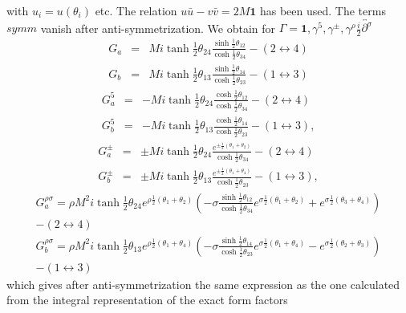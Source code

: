 \documentclass[a4paper,a4paper]{article}
\begin{document}
with $u_{i}=u(\theta _{i})$ etc. The relation $u\bar{u}-v\bar{v}=2M\mathbf{1}
$ has been used. The terms $symm$ vanish after anti-symmetrization. We
obtain for $\Gamma =\mathbf{1,}\gamma ^{5},\gamma ^{\pm },\gamma ^{\rho }%
\frac{i}{2}\overleftrightarrow{\partial ^{\sigma }}$ 
\begin{eqnarray*}
G_{a} &=&Mi\tanh \tfrac{1}{2}\theta _{24}\frac{\sinh \tfrac{1}{2}\theta _{12}%
}{\cosh \tfrac{1}{2}\theta _{34}}-(2\leftrightarrow 4) \\
G_{b} &=&Mi\tanh \tfrac{1}{2}\theta _{13}\frac{\sinh \tfrac{1}{2}\theta _{14}%
}{\cosh \tfrac{1}{2}\theta _{23}}-(1\leftrightarrow 3)
\end{eqnarray*}
\begin{eqnarray*}
G_{a}^{5} &=&-Mi\tanh \tfrac{1}{2}\theta _{24}\frac{\cosh \tfrac{1}{2}\theta
_{12}}{\cosh \tfrac{1}{2}\theta _{34}}-(2\leftrightarrow 4) \\
G_{b}^{5} &=&-Mi\tanh \tfrac{1}{2}\theta _{13}\frac{\cosh \tfrac{1}{2}\theta
_{14}}{\cosh \tfrac{1}{2}\theta _{23}}-(1\leftrightarrow 3),
\end{eqnarray*}
\begin{eqnarray*}
G_{a}^{\pm } &=&\pm Mi\tanh \tfrac{1}{2}\theta _{24}\frac{e^{\pm \frac{1}{2}%
(\theta _{1}+\theta _{2})}}{\cosh \tfrac{1}{2}\theta _{34}}%
-(2\leftrightarrow 4) \\
G_{b}^{\pm } &=&\pm Mi\tanh \tfrac{1}{2}\theta _{13}\frac{e^{\pm \frac{1}{2}%
(\theta _{1}+\theta _{4})}}{\cosh \tfrac{1}{2}\theta _{23}}%
-(1\leftrightarrow 3),
\end{eqnarray*}
\begin{gather*}
G_{a}^{\rho \sigma }=\rho M^{2}i\tanh \tfrac{1}{2}\theta _{24}e^{\rho \frac{1%
}{2}(\theta _{1}+\theta _{2})}\left( -\sigma \frac{\sinh \tfrac{1}{2}\theta
_{12}}{\cosh \tfrac{1}{2}\theta _{34}}e^{\sigma \frac{1}{2}(\theta
_{1}+\theta _{2})}+e^{\sigma \frac{1}{2}(\theta _{3}+\theta _{4})}\right) \\
-(2\leftrightarrow 4)~~~~~~~~~~~~~~ \\
G_{b}^{\rho \sigma }=\rho M^{2}i\tanh \tfrac{1}{2}\theta _{13}e^{\rho \frac{1%
}{2}(\theta _{1}+\theta _{4})}\left( -\sigma \frac{\sinh \tfrac{1}{2}\theta
_{14}}{\cosh \tfrac{1}{2}\theta _{23}}e^{\sigma \frac{1}{2}(\theta
_{1}+\theta _{4})}-e^{\sigma \frac{1}{2}(\theta _{2}+\theta _{3})}\right) \\
-(1\leftrightarrow 3)~~~~~~~~~~~~~~
\end{gather*}
which gives after anti-symmetrization the same expression as the one
calculated from the integral representation of the exact form factors
\end{document}
